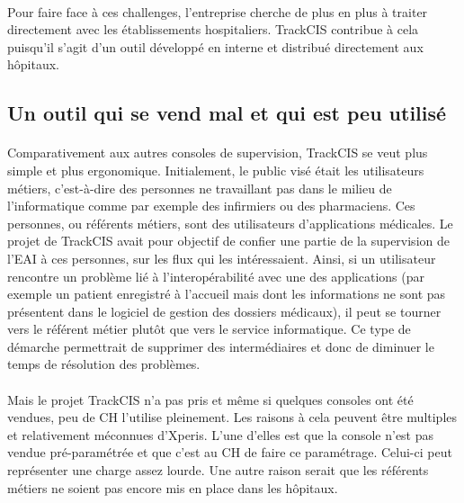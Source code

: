 			\paragraph{}%
			Pour faire face à ces challenges, l'entreprise cherche de plus 
			en plus à traiter directement avec les établissements hospitaliers. TrackCIS
			contribue à cela puisqu'il s'agit d'un outil développé en interne et
			distribué directement aux hôpitaux.
			
		\subsection{Un outil qui se vend mal et qui est peu utilisé}
			\paragraph{}%
			Comparativement aux autres consoles de supervision, TrackCIS se veut plus
			simple et plus ergonomique. Initialement, le public visé était les
			utilisateurs métiers, c'est-à-dire des personnes ne travaillant pas dans le
			milieu de l'informatique comme par exemple des infirmiers ou des pharmaciens.
			Ces personnes, ou référents métiers, sont des utilisateurs d'applications
			médicales. Le projet de TrackCIS avait pour objectif de confier une partie de
			la supervision de l'EAI à ces personnes, sur les flux qui les intéressaient.
			Ainsi, si un utilisateur rencontre un problème lié à l'interopérabilité avec
			une des applications (par exemple un patient enregistré à l'accueil mais dont
			les informations ne sont pas présentent dans le logiciel de gestion des
			dossiers médicaux), il peut se tourner vers le référent métier plutôt que
			vers le service informatique. Ce type de démarche permettrait de supprimer
			des intermédiaires et donc de diminuer le temps de résolution des problèmes.
			
			\paragraph{}%
			Mais le projet TrackCIS n'a pas pris et même si quelques consoles ont été
			vendues, peu de CH l'utilise pleinement. Les raisons à cela peuvent être
			multiples et relativement méconnues d'Xperis. L'une d'elles est que la
			console n'est pas vendue pré-paramétrée et que c'est au CH de faire ce
			paramétrage.
			Celui-ci peut représenter une charge assez lourde. Une autre raison serait
			que les référents métiers ne soient pas encore mis en place dans les
			hôpitaux.
			
